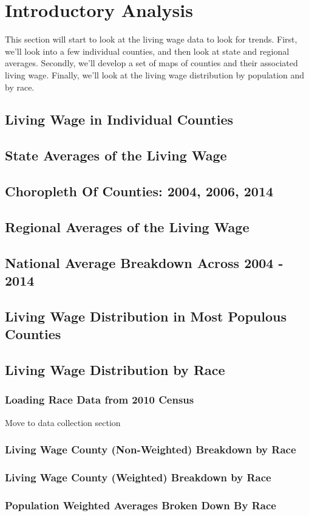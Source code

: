 \chapter{Introductory Analysis}\label{ch:intro_analysis}

This section will start to look at the living wage data to look for trends. First, we'll look into a few individual counties, and then look at state and regional averages. Secondly, we'll develop a set of maps of counties and their associated living wage. Finally, we'll look at the living wage distribution by population and by race.

\section{Living Wage in Individual Counties}

\section{State Averages of the Living Wage}

\section{Choropleth Of Counties: 2004, 2006, 2014}

\section{Regional Averages of the Living Wage}

\section{National Average Breakdown Across 2004 - 2014}

\section{Living Wage Distribution in Most Populous Counties}

\section{Living Wage Distribution by Race}

\subsection{Loading Race Data from 2010 Census}

Move to data collection section
	
\subsection{Living Wage County (Non-Weighted) Breakdown by Race}

\subsection{Living Wage County (Weighted) Breakdown by Race}

\subsection{Population Weighted Averages Broken Down By Race}

